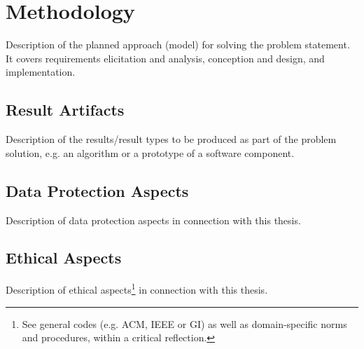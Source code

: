 \chapter{Methodology}
\label{ch:methodology}

Description of the planned approach (model) for solving the problem statement.
It covers requirements elicitation and analysis, conception and design, and
implementation.

\section{Result Artifacts}
Description of the results/result types to be produced as part of the problem
solution, e.g. an algorithm or a prototype of a software component.

\section{Data Protection Aspects}
Description of data protection aspects in connection with this thesis.

\section{Ethical Aspects}
Description of ethical aspects\footnote{See general codes (e.g. ACM, IEEE or
GI) as well as domain-specific norms and procedures, within a critical
reflection.} in connection with this thesis.
